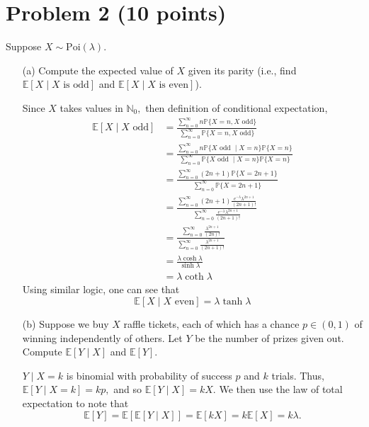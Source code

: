 \documentclass[11pt]{article}
\newcommand{\bbE}{\mathbb{E}}
\newcommand{\bbN}{\mathbb{N}}
\newcommand{\bbP}{\mathbb{P}}
\begin{document}
\section*{Problem 2 (10 points)}
Suppose \(X \sim \text{Poi}(\lambda)\).
\begin{itemize}
    \item[(a)] Compute the expected value of \(X\) given its parity (i.e., find \(\mathbb{E}[X \mid X \text{ is odd}]\) and \(\mathbb{E}[X \mid X \text{ is even}]\)).
    \begin{solution}
    Since $X$ takes values in $\bbN_0,$ then definition of conditional expectation, 
    \begin{align*}
        \bbE[X \mid X \text{ odd}] &= \frac{\displaystyle\sum_{n = 0}^\infty n \bbP\{X= n, X \text{ odd}\}}{\displaystyle\sum_{n=0}^\infty  \bbP\{X = n, X \text{ odd}\}}\\
        &= \frac{\displaystyle\sum_{n = 0}^\infty n \bbP\{X \text{ odd } \mid X = n\}\bbP\{X= n\}}{\displaystyle\sum_{n=0}^\infty  \bbP\{X \text{ odd } \mid X = n\}\bbP\{X= n\}}\\
        &= \frac{\displaystyle\sum_{n = 0}^\infty (2n+1) \bbP\{X= 2n+1\}}{\displaystyle\sum_{n=0}^\infty  \bbP\{X= 2n+1\}}\\
        &= \frac{\displaystyle\sum_{n = 0}^\infty (2n+1) \frac{e^{-\lambda}\lambda^{2n +1}}{(2n+1)!}}{\displaystyle\sum_{n=0}^\infty  \frac{e^{-\lambda}\lambda^{2n +1}}{(2n+1)!}}\\
        &= \frac{\displaystyle\sum_{n=0}^\infty \frac{\lambda^{2n +1}}{(2n)!}}{\displaystyle\sum_{n=0}^\infty \frac{\lambda^{2n +1}}{(2n+1)!}}\\
        &= \frac{\lambda \cosh{\lambda}}{\sinh{\lambda}}\\
        &= \lambda \coth{\lambda}
    \end{align*}
    Using similar logic, one can see that 
    \[\bbE[X \mid X\text{ even}]=  \lambda \tanh{\lambda}\]
    \end{solution}
    \item[(b)] Suppose we buy \(X\) raffle tickets, each of which has a chance \(p \in (0, 1)\) of winning independently of others. Let \(Y\) be the number of prizes given out. Compute \(\mathbb{E}[Y \mid X]\) and \(\mathbb{E}[Y]\).
    \begin{solution}
$Y \mid X = k$ is binomial with probability of success $p$ and $k$ trials. Thus, $\bbE[Y \mid X = k] = k p,$ and so $\bbE[Y \mid X] = kX.$ We then use the law of total expectation to note that
\[\bbE[Y] = \bbE[\bbE[Y \mid X]] = \bbE[kX] = k\bbE[X] = k\lambda.\]

    \end{solution}
\end{itemize}
\end{document}
